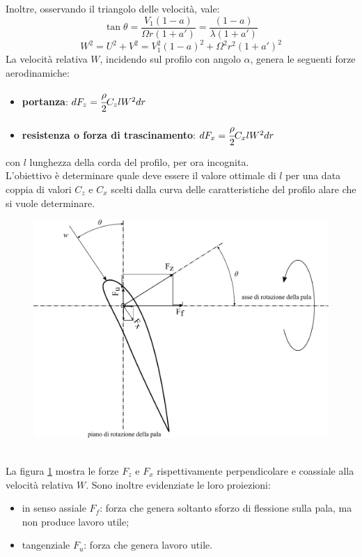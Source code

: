 Inoltre, osservando il triangolo delle velocità, vale:
\begin{equation}\label{eq:tantheta}
\tan \theta = \frac{V_1 \left(1-a \right)}{\Omega r \left(1 + a' \right)} = \frac{\left( 1-a \right)}{\lambda \left( 1 + a' \right)}
\end{equation}
\begin{equation}
	W^2 = U^2 + V^2 = V_1^2 \left(1-a \right)^2 + \Omega^2 r^2 \left( 1+ a' \right)^2
\end{equation}
La velocità relativa $W$, incidendo sul profilo con angolo $\alpha$, genera le seguenti forze aerodinamiche:
\begin{itemize}
	\item \textbf{portanza}: $dF_z = \cfrac{\rho}{2} C_z l W^2 dr$
	\item \textbf{resistenza o forza di trascinamento}: $dF_x = \cfrac{\rho}{2} C_x l W^2 dr$
\end{itemize}
con $l$ lunghezza della corda del profilo, per ora incognita.\\
L'obiettivo è determinare quale deve essere il valore ottimale di $l$ per una data coppia di valori $C_z$ e $C_x$ scelti dalla curva delle caratteristiche del profilo alare che si vuole determinare. 
\begin{figure}[h!]
\centering
  \includegraphics[width=.9\textwidth]{fig/forzeEol.pdf}
\caption{}
\label{fig:forzeEol}
\end{figure}
\\La figura \ref{fig:forzeEol} mostra le forze $F_z$ e $F_x$ rispettivamente perpendicolare e coassiale alla velocità relativa $W$. Sono inoltre evidenziate le loro proiezioni:
\begin{itemize}
	\item in senso assiale $F_f$: forza che genera soltanto sforzo di flessione sulla pala, ma non produce lavoro utile;
	\item tangenziale $F_u$: forza che genera lavoro utile.
\end{itemize}

